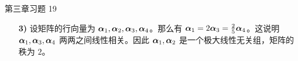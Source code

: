 \begin{problem}
	第三章习题 19

	\begin{solution}
		\begin{enumerate}
			\item[\textbf{3)}] 设矩阵的行向量为 $\boldsymbol{\alpha}_1, \boldsymbol{\alpha}_2, \boldsymbol{\alpha}_3, \boldsymbol{\alpha}_4$。那么有 $\boldsymbol{\alpha}_1 = 2 \boldsymbol{\alpha}_3 = \frac{2}{5} \boldsymbol{\alpha}_4$。这说明 $\boldsymbol{\alpha}_1, \boldsymbol{\alpha}_3, \boldsymbol{\alpha}_4$ 两两之间线性相关。因此 $\boldsymbol{\alpha}_1, \boldsymbol{\alpha}_2$ 是一个极大线性无关组，矩阵的秩为 $2$。
		\end{enumerate}
	\end{solution}
\end{problem}
